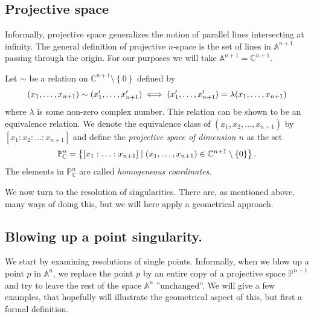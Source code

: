 \documentclass{article}
\newcommand{\C}{\ensuremath{\mathbb{C}}}
\newcommand{\A}{\ensuremath{\mathbb{A}}}
\renewcommand{\P}{\ensuremath{\mathbb{P}}}
\begin{document}
    \subsection{Projective space}
    \label{sub:projective_space}
    
    Informally, projective space generalizes the notion of parallel lines
    intersecting at infinity. The general definition of projective $n$-space is
    the set of lines in $\A^{n+1}$ passing through the origin. For our purposes
    we will take $\A^{n+1} = \C^{n+1}$.

    \begin{definition}
        Let $\sim$ be a relation on $\C^{n+1}\setminus \left\{ 0 \right\}$ defined by
        \begin{equation}
            \notag
            (x_1, \ldots, x_{n+1}) \sim (x_1', \ldots, x_{n+1}')
            \iff (x_1', \ldots, x_{n+1}') = \lambda(x_1, \ldots,
            x_{n+1})
        \end{equation}
        where $\lambda$ is some non-zero complex number. This relation can be
        shown to be an equivalence relation. We denote the
        equivalence class of $(x_1, x_2, \ldots, x_{n+1})$ by $\left[ x_1 : x_2
        : \ldots : x_{n+1} \right]$ and define the \emph{projective space of
        dimension $n$} as the set 
        \begin{equation}
            \notag
            \P^{n}_\C = \left\{ \left[ x_1 : \ldots : x_{n+1} \right] \mid (x_1,
            \ldots , x_{n+1}) \in \C^{n+1}\setminus \left\{ 0 \right\}\right\}.
        \end{equation}
        The elements in $\P_\C^n$ are called \emph{homogeneous
        coordinates}. 
    \end{definition}

    We now turn to the resolution of singularities. There are, as mentioned
    above, many ways of doing this, but we will here apply a geometrical
    approach.

    \subsection{Blowing up a point singularity.}
    \label{sub:blowing_up_a_point_singularity_}
    
    We start by examining resolutions of single points. Informally, when we
    blow up a point $p$ in $\A^n$, we replace the point $p$ by an entire copy
    of a projective space $\P^{n-1}$ and try to leave the rest of the space
    $\A^n$ ''unchanged''. We will give a few examples, that hopefully will
    illustrate the geometrical aspect of this, but first a formal definition.
\end{document}
